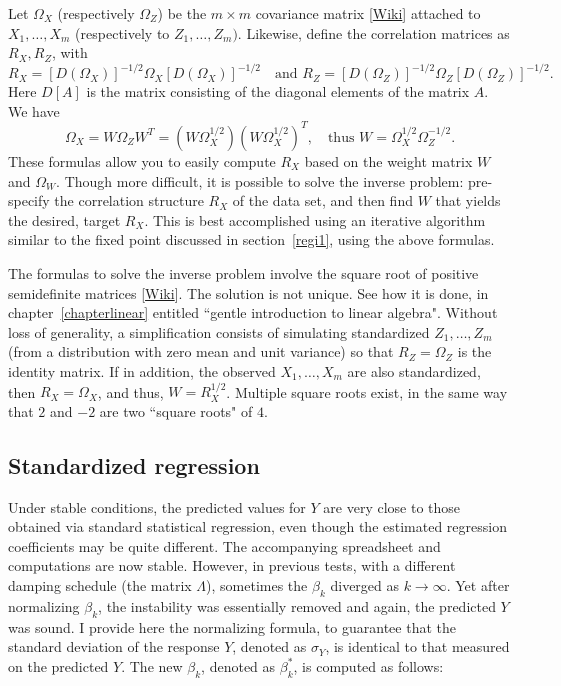 \documentclass[oneside,10pt]{book}
\begin{document}
Let $\Omega_X$ (respectively $\Omega_Z$) be the $m\times m$ \textcolor{index}{covariance matrix} [\href{https://en.wikipedia.org/wiki/Covariance_matrix}{Wiki}] attached to $X_1,\dots,X_m$
 (respectively to $Z_1,\dots,Z_m)$. Likewise, define the correlation matrices as $R_X, R_Z$, with 
$$R_X=[D(\Omega_X)]^{-1/2}\Omega_X [D(\Omega_X)]^{-1/2}\quad \text{and } R_Z=[D(\Omega_Z)]^{-1/2}\Omega_Z [D(\Omega_Z)]^{-1/2}.$$
Here $D[A]$ is the matrix consisting of the diagonal elements of the matrix $A$. 
We have 
$$\Omega_X=W\Omega_Z W^T=(W\Omega_X^{1/2})(W\Omega_X^{1/2})^T,\quad \text{thus } W=\Omega_X^{1/2}\Omega_Z^{-1/2}.$$
These formulas allow you to easily compute $R_X$ based on the weight matrix $W$ and $\Omega_W$. Though more difficult, it is possible to solve the inverse problem: pre-specify the correlation structure $R_X$ of the data set, and then 
find $W$ that yields the desired, target $R_X$. This is best accomplished using an iterative algorithm similar to the fixed point discussed in section~\ref{regi1}, using the above formulas. 

The formulas to solve the inverse problem involve  the \textcolor{index}{square root} of \textcolor{index}{positive semidefinite matrices} [\href{https://en.wikipedia.org/wiki/Square_root_of_a_matrix}{Wiki}]. The solution is not unique. See how it is done, in chapter~\ref{chapterlinear} entitled ``gentle introduction to linear algebra". Without loss of generality, a simplification consists of simulating standardized $Z_1,\dots,Z_m$ (from a distribution with zero mean and unit variance) so that $R_Z=\Omega_Z$  is the identity matrix. If in addition, the observed $X_1,\dots,X_m$ are also standardized, then $R_X=\Omega_X$, and thus, 
$W=R_X^{1/2}$. Multiple square roots exist, in the same way that $2$ and $-2$ are two ``square roots" of $4$.

\subsection{Standardized regression}

Under stable conditions,  the predicted values for $Y$ are very close to those obtained via standard statistical regression, 
even though the estimated regression coefficients may be quite different. The accompanying spreadsheet and computations are now stable. However,
in previous tests, with a different damping schedule (the matrix $\Lambda$),  sometimes the $\beta_k$ diverged as $k\rightarrow\infty$.  Yet after normalizing $\beta_k$, the instability was essentially removed and again, the predicted $Y$ was sound. I provide here the normalizing formula, to guarantee that the standard deviation of the response $Y$, denoted as $\sigma_Y$, is identical to that measured on the predicted $Y$. The new $\beta_k$, denoted as $\beta_k^*$, is computed as follows:
\end{document}
